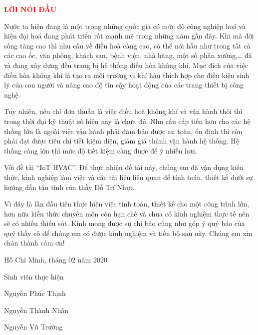 \begin{center}
	\textbf{{\Large \textcolor{red}{LỜI NÓI ĐẦU}}}
\end{center}

Nước ta hiện đang là một trong những quốc gia có mức độ công nghiệp hoá và hiện đại hoá đang phát triển rất mạnh mẽ trong những năm gần đây. Khi mà đời sống tăng cao thì nhu cầu về điều hoà càng cao, có thể nói hầu như trong tất cả các cao ốc, văn phòng, khách sạn, bệnh viện, nhà hàng, một số phân xưởng,… đã và đang xây dựng đều trang bị hệ thống điều hòa không khí. Mục đích của việc điều hòa không khí là tạo ra môi trường vi khí hậu thích hợp cho điều kiện sinh lý của con người và nâng cao độ tin cậy hoạt động của các trang thiết bị công nghệ.

Tuy nhiên, nếu chỉ đơn thuần là việc điều hoà không khí và vận hành thôi thì trong thời đại kỹ thuật số hiện nay là chưa đủ. Nhu cầu cấp tiến hơn cho các hệ thống lớn là ngoài việc vận hành phải đảm bảo được an toàn, ổn định thì còn phải đạt được tiêu chí tiết kiệm điện, giảm giá thành vận hành hệ thống. Hệ thống càng lớn thì mức độ tiết kiệm càng được để ý nhiều hơn. 

Với đề tài ``IoT HVAC''. Để thực nhiện đề tài này, chúng em đã vận dụng kiến thức, kinh nghiệp làm việc và các tài liệu liên quan để tính toán, thiết kế dưới sự hướng dẫn tận tình của thầy Đỗ Trí Nhựt.

Vì đây là lần đầu tiên thực hiện việc tính toán, thiết kế cho một công trình lớn, hơn nữa kiến thức chuyên môn còn hạn chế và chưa có kinh nghiệm thực tế nên sẽ có nhiều thiếu sót. Kính mong được sự chỉ bảo cũng như góp ý quý báo của quý thầy cô để chúng em có được kinh nghiệm và tiến bộ sau này. Chúng em xin chân thành cảm ơn!

\begin{flushright}
	Hồ Chí Minh, tháng 02 năm 2020
	
	Sinh viên thực hiện
	
	Nguyễn Phúc Thịnh
	
	Nguyễn Thành Nhân
	
	Nguyễn Vũ Trường
\end{flushright}
